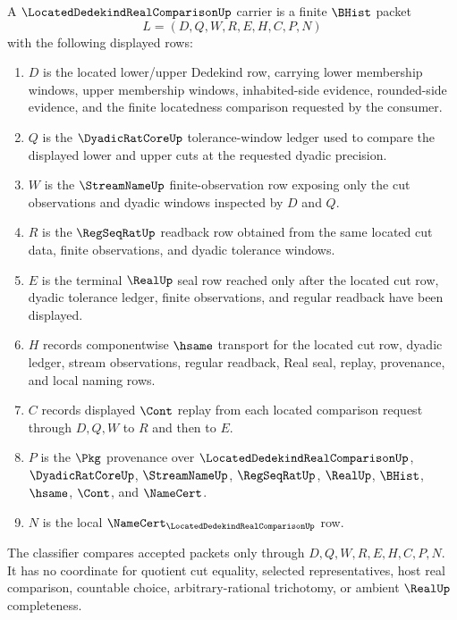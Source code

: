 \begin{definition}
\label{def:located-dedekind-real-comparison-carrier}
A $\LocatedDedekindRealComparisonUp$ carrier is a finite $\BHist$ packet
$$
L=(D,Q,W,R,E,H,C,P,N)
$$
with the following displayed rows:
\begin{enumerate}
\item $D$ is the located lower/upper Dedekind row, carrying lower membership windows, upper membership windows, inhabited-side evidence, rounded-side evidence, and the finite locatedness comparison requested by the consumer.
\item $Q$ is the $\DyadicRatCoreUp$ tolerance-window ledger used to compare the displayed lower and upper cuts at the requested dyadic precision.
\item $W$ is the $\StreamNameUp$ finite-observation row exposing only the cut observations and dyadic windows inspected by $D$ and $Q$.
\item $R$ is the $\RegSeqRatUp$ readback row obtained from the same located cut data, finite observations, and dyadic tolerance windows.
\item $E$ is the terminal $\RealUp$ seal row reached only after the located cut row, dyadic tolerance ledger, finite observations, and regular readback have been displayed.
\item $H$ records componentwise $\hsame$ transport for the located cut row, dyadic ledger, stream observations, regular readback, Real seal, replay, provenance, and local naming rows.
\item $C$ records displayed $\Cont$ replay from each located comparison request through $D,Q,W$ to $R$ and then to $E$.
\item $P$ is the $\Pkg$ provenance over $\LocatedDedekindRealComparisonUp$, $\DyadicRatCoreUp$, $\StreamNameUp$, $\RegSeqRatUp$, $\RealUp$, $\BHist$, $\hsame$, $\Cont$, and $\NameCert$.
\item $N$ is the local $\NameCert_{\LocatedDedekindRealComparisonUp}$ row.
\end{enumerate}
The classifier compares accepted packets only through $D,Q,W,R,E,H,C,P,N$. It has no coordinate for quotient cut equality, selected representatives, host real comparison, countable choice, arbitrary-rational trichotomy, or ambient $\RealUp$ completeness.
\end{definition}

